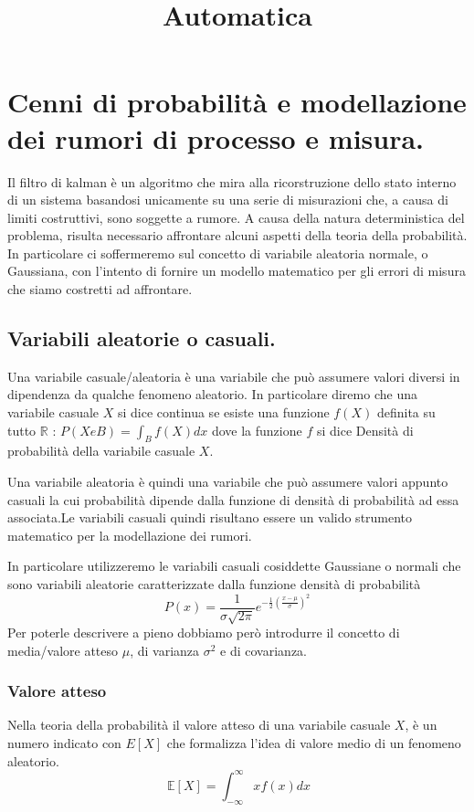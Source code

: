 \documentclass[12pt,a4paper]{article}
\title{Automatica}
\begin{document}
\section{Cenni di probabilità e modellazione dei rumori di processo e misura.}

Il filtro di kalman è un algoritmo che mira alla ricorstruzione dello stato interno di un sistema basandosi unicamente su una serie di misurazioni che, a causa di limiti costruttivi, sono soggette a rumore.
A causa della natura deterministica del problema, risulta necessario affrontare alcuni aspetti della teoria della probabilità. In particolare ci soffermeremo sul concetto di variabile aleatoria normale, o Gaussiana, con l’intento di fornire un modello matematico per gli errori di misura che siamo costretti ad affrontare.

\subsection{Variabili aleatorie o casuali.}

Una variabile casuale/aleatoria è una variabile che può assumere valori diversi in dipendenza da qualche fenomeno aleatorio.
In particolare diremo che una variabile casuale $X$ si dice continua se esiste una funzione $f(X)$ definita su tutto $\mathbb{R}$ : $P(X e B) = \int_B f(X) dx$ dove la funzione $f$ si dice Densità di probabilità della variabile casuale $X$.

Una variabile aleatoria è quindi una variabile che può assumere valori appunto casuali la cui probabilità dipende dalla funzione di densità di probabilità ad essa associata.Le variabili casuali quindi risultano essere un valido strumento matematico per la modellazione dei rumori.

In particolare utilizzeremo le variabili casuali cosiddette Gaussiane o normali che sono variabili aleatorie caratterizzate dalla funzione densità di probabilità \[P(x) = \frac{1}{{\sigma \sqrt {2\pi } }}e^{-\frac{1}{2}{(\frac{x-\mu}{\sigma})}^2}\] Per poterle descrivere a pieno dobbiamo però introdurre il concetto di media/valore atteso $\mu$, di varianza $\sigma^2$ e di covarianza.

\subsubsection{Valore atteso}

Nella teoria della probabilità il valore atteso di una variabile casuale $X$, è un numero indicato con $E[X]$ che formalizza l'idea di valore medio di un fenomeno aleatorio.
\[\ {\mathbb  {E}}[X]=\int _{{-\infty }}^{{\infty }}xf(x)dx\]
\end{document}
